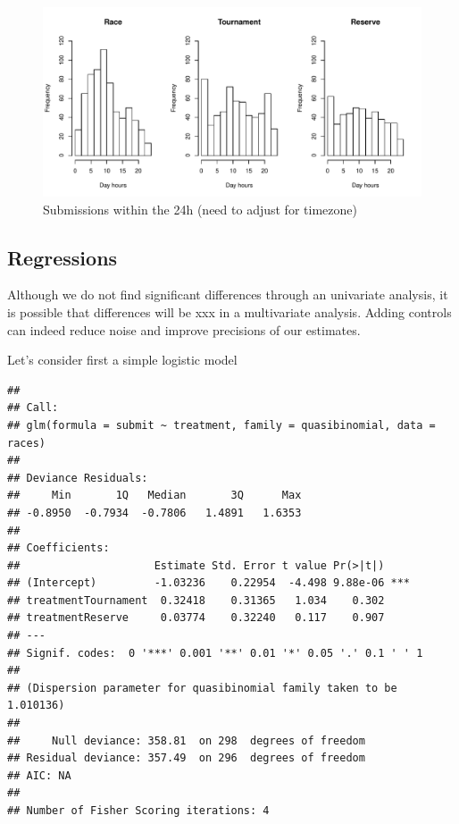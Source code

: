 \documentclass[12pt,]{article}
\theoremstyle{plain} %
\begin{document}
\begin{figure}
\centering
\includegraphics{Figures/unnamed-chunk-16-1.pdf}
\caption{Submissions within the 24h (need to adjust for timezone)}
\end{figure}

\subsection{Regressions}\label{regressions}

Although we do not find significant differences through an univariate
analysis, it is possible that differences will be xxx in a multivariate
analysis. Adding controls can indeed reduce noise and improve precisions
of our estimates.

Let's consider first a simple logistic model

\begin{verbatim}
## 
## Call:
## glm(formula = submit ~ treatment, family = quasibinomial, data = races)
## 
## Deviance Residuals: 
##     Min       1Q   Median       3Q      Max  
## -0.8950  -0.7934  -0.7806   1.4891   1.6353  
## 
## Coefficients:
##                     Estimate Std. Error t value Pr(>|t|)    
## (Intercept)         -1.03236    0.22954  -4.498 9.88e-06 ***
## treatmentTournament  0.32418    0.31365   1.034    0.302    
## treatmentReserve     0.03774    0.32240   0.117    0.907    
## ---
## Signif. codes:  0 '***' 0.001 '**' 0.01 '*' 0.05 '.' 0.1 ' ' 1
## 
## (Dispersion parameter for quasibinomial family taken to be 1.010136)
## 
##     Null deviance: 358.81  on 298  degrees of freedom
## Residual deviance: 357.49  on 296  degrees of freedom
## AIC: NA
## 
## Number of Fisher Scoring iterations: 4
\end{verbatim}
\end{document}
